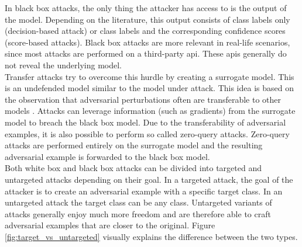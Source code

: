 In black box attacks, the only thing the attacker has access to is the output of the model. Depending on the literature, this output consists of class labels only (decision-based attack) or class labels and the corresponding confidence scores (score-based attacks). Black box attacks are more relevant in real-life scenarios, since most attacks are performed on a third-party \gls{api}. These \glspl{api} generally do not reveal the underlying model.\\

Transfer attacks \cite{transfer_attack} try to overcome this hurdle by creating a surrogate model. This is an undefended model similar to the model under attack. This idea is based on the observation that adversarial perturbations often are transferable to other models \cite{FGSM}. Attacks can leverage information (such as gradients) from the surrogate model to breach the black box model. Due to the transferability of adversarial examples, it is also possible to perform so called zero-query attacks. Zero-query attacks are performed entirely on the surrogate model and the resulting adversarial example is forwarded to the black box model.\\

Both white box and black box attacks can be divided into targeted and untargeted attacks depending on their goal. In a targeted attack, the goal of the attacker is to create an adversarial example with a specific target class. In an untargeted attack the target class can be any class. Untargeted variants of attacks generally enjoy much more freedom and are therefore able to craft adversarial examples that are closer to the original. Figure \ref{fig:target_vs_untargeted} visually explains the difference between the two types.

